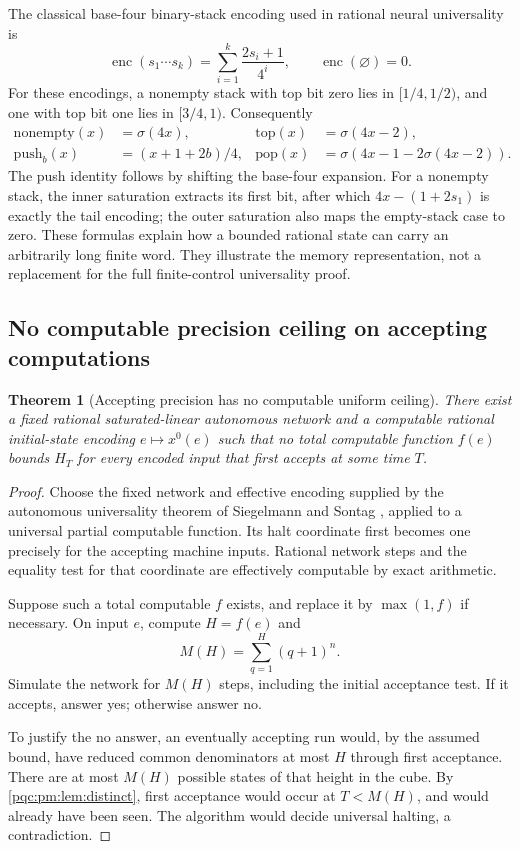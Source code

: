 \documentclass[11pt,letterpaper]{article}
\numberwithin{equation}{section}
\newtheorem{theorem}{Theorem}[section]
\theoremstyle{definition}
\theoremstyle{remark}
\newcommand{\enc}{\operatorname{enc}}
\begin{document}
The classical base-four binary-stack encoding used in rational neural
universality is \cite{b62s15-ss}
\begin{equation}\label{pqc:pm:eq:stack}
 \enc(s_1\cdots s_k)=\sum_{i=1}^k\frac{2s_i+1}{4^i},
 \qquad \enc(\varnothing)=0.
\end{equation}
For these encodings, a nonempty stack with top bit zero lies in $[1/4,1/2)$,
and one with top bit one lies in $[3/4,1)$. Consequently
\begin{align*}
 \mathrm{nonempty}(x)&=\sigma(4x),&
 \mathrm{top}(x)&=\sigma(4x-2),\\
 \mathrm{push}_b(x)&=(x+1+2b)/4,&
 \mathrm{pop}(x)&=\sigma(4x-1-2\sigma(4x-2)).
\end{align*}
The push identity follows by shifting the base-four expansion. For a
nonempty stack, the inner saturation extracts its first bit, after which
$4x-(1+2s_1)$ is exactly the tail encoding; the outer saturation also maps
the empty-stack case to zero. These formulas explain how a bounded rational
state can carry an arbitrarily long finite word. They illustrate the memory
representation, not a replacement for the full finite-control universality
proof.

\subsection{No computable precision ceiling on accepting computations}

\begin{theorem}[Accepting precision has no computable uniform ceiling]
\label{pqc:pm:thm:no-ceiling}
There exist a fixed rational saturated-linear autonomous network and a
computable rational initial-state encoding $e\mapsto x^0(e)$ such that no
total computable function $f(e)$ bounds $H_T$ for every encoded input that
first accepts at some time $T$.
\end{theorem}

\begin{proof}
Choose the fixed network and effective encoding supplied by the autonomous
universality theorem of Siegelmann and Sontag \cite[Theorem 2]{b62s15-ss}, applied
to a universal partial computable function. Its halt coordinate first
becomes one precisely for the accepting machine inputs. Rational network
steps and the equality test for that coordinate are effectively computable
by exact arithmetic.

Suppose such a total computable $f$ exists, and replace it by
$\max(1,f)$ if necessary. On input $e$, compute $H=f(e)$ and
\[
 M(H)=\sum_{q=1}^H(q+1)^n.
\]
Simulate the network for $M(H)$ steps, including the initial acceptance
test. If it accepts, answer yes; otherwise answer no.

To justify the no answer, an eventually accepting run would, by the assumed
bound, have reduced common denominators at most $H$ through first
acceptance. There are at most $M(H)$ possible states of that height in the
cube. By \cref{pqc:pm:lem:distinct}, first acceptance would occur at $T<M(H)$,
and would already have been seen. The algorithm would decide universal
halting, a contradiction.
\end{proof}
\end{document}
